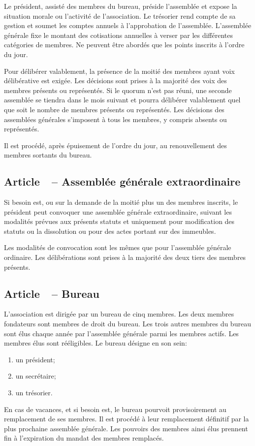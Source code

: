 \documentclass{article}
\newcounter{cptrArt}
\newcommand{\Art}[1]{\refstepcounter{cptrArt}\subsection*{Article~\thecptrArt\xspace~-- #1}}
\begin{document}
Le président, assisté des membres du bureau, préside l'assemblée et expose la situation morale ou l’activité de l'association.
Le trésorier rend compte de sa gestion et soumet les comptes annuels à l'approbation de l'assemblée.
L’assemblée générale fixe le montant des cotisations annuelles à verser par les différentes catégories de membres.
Ne peuvent être abordés que les points inscrits à l'ordre du jour.

Pour délibérer valablement, la présence de la moitié des membres ayant voix délibérative est exigée. Les décisions sont prises à la majorité des voix des membres présents ou représentés. Si le quorum n’est pas réuni, une seconde assemblée se tiendra dans le mois suivant et pourra délibérer valablement quel que soit le nombre de membres présents ou représentés. Les décisions des assemblées générales s’imposent à tous les membres, y compris absents ou représentés.

Il est procédé, après épuisement de l'ordre du jour, au renouvellement des membres sortants du bureau.


\Art{Assemblée générale extraordinaire}
\label{art:assemblee_generale_extraordinaire}

Si besoin est, ou sur la demande de la moitié plus un des membres inscrits, le président peut convoquer une assemblée générale extraordinaire, suivant les modalités prévues aux présents statuts et uniquement pour modification des statuts ou la dissolution ou pour des actes portant sur des immeubles.

Les modalités de convocation sont les mêmes que pour l’assemblée générale ordinaire. Les délibérations sont prises à la majorité des deux tiers des membres présents.


\Art{Bureau}

L'association est dirigée par un bureau de cinq membres. Les deux membres fondateurs sont membres de droit du bureau. Les trois autres membres du bureau sont élus chaque année par l'assemblée générale parmi les membres actifs. Les membres élus sont rééligibles. Le bureau désigne en son sein:

\begin{enumerate}
\item
  un président;
\item
  un secrétaire;
\item
  un trésorier.
\end{enumerate}

En cas de vacances, et si besoin est, le bureau pourvoit provisoirement au remplacement de ses membres. Il est procédé à leur remplacement définitif par la plus prochaine assemblée générale. Les pouvoirs des membres ainsi élus prennent fin à l'expiration du mandat des membres remplacés.
\end{document}
